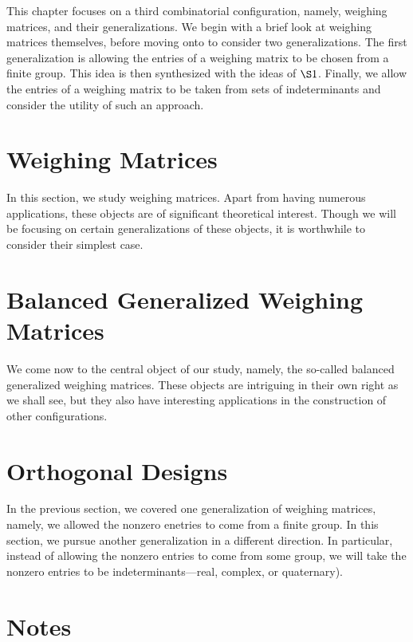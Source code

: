 \documentclass[../../main]{subfiles}
\newcommand{\Bnote}[1]{\bnote{#1}\big)}
\begin{document}
This chapter focuses on a third combinatorial configuration, namely, weighing matrices, and their generalizations. We begin with a brief look at weighing matrices themselves, before moving onto to consider two generalizations. The first generalization is allowing the entries of a weighing matrix to be chosen from a finite group. This idea is then synthesized with the ideas of $\S1$. Finally, we allow the entries of a weighing matrix to be taken from sets of indeterminants and consider the utility of such an approach.
 
 \section{\centering Weighing Matrices}
 
 In this section, we study weighing matrices. Apart from having numerous applications, these objects are of significant theoretical interest. Though we will be focusing on certain generalizations of these objects, it is worthwhile to consider their simplest case.
 
 \dinkus
 
 
 
 \section{\centering Balanced Generalized Weighing Matrices}
 
 We come now to the central object of our study, namely, the so-called balanced generalized weighing matrices. These objects are intriguing in their own right as we shall see, but they also have interesting applications in the construction of other configurations.
 
 \dinkus
 
 
 
 \section{\centering Orthogonal Designs}
 
 In the previous section, we covered one generalization of weighing matrices, namely, we allowed the nonzero enetries to come from a finite group. In this section, we pursue another generalization in a different direction. In particular, instead of allowing the nonzero entries to come from some group, we will take the nonzero entries to be indeterminants---real, complex, or quaternary\Bnote{quaternary}.
 
 \dinkus
 
 
 
 \singlespace
 
 \section*{\centering Notes}
 \thebnotes
 
 \doublespacing
 
 \biblio
\end{document}
